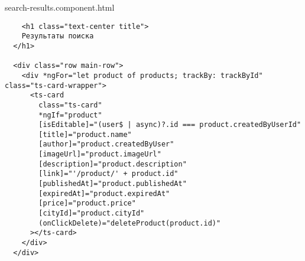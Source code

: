search-results.component.html
\begin{lstlisting}
    <h1 class="text-center title">
    Результаты поиска
  </h1>
  
  <div class="row main-row">
    <div *ngFor="let product of products; trackBy: trackById" class="ts-card-wrapper">
      <ts-card
        class="ts-card"
        *ngIf="product"
        [isEditable]="(user$ | async)?.id === product.createdByUserId"
        [title]="product.name"
        [author]="product.createdByUser"
        [imageUrl]="product.imageUrl"
        [description]="product.description"
        [link]="'/product/' + product.id"
        [publishedAt]="product.publishedAt"
        [expiredAt]="product.expiredAt"
        [price]="product.price"
        [cityId]="product.cityId"
        (onClickDelete)="deleteProduct(product.id)"
      ></ts-card>
    </div>
  </div>  
\end{lstlisting}


